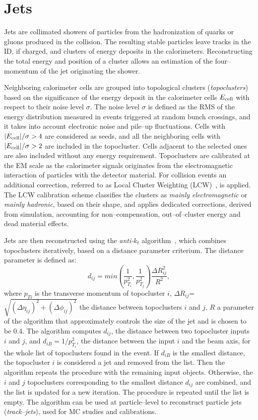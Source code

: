\section{Jets}
\label{sec:jets}

Jets are collimated showers of particles from the hadronization of
quarks or gluons produced in the collision.
The resulting stable particles leave tracks in the ID, if charged, and
clusters of energy deposits in the calorimeters.
Reconstructing the total energy and position of a cluster allows an
estimation of the four--momentum of the jet originating the shower.

Neighboring calorimeter cells are grouped into topological clusters
({\it topoclusters}) based on the significance of the energy deposit
in the calorimeter cells $E_{\rm cell}$ with respect to their noise
level $\sigma$. The noise level $\sigma$ is defined as the RMS of the
energy distribution measured in events triggered at random bunch
crossings, and it takes into account electronic noise and pile--up
fluctuations. Cells with $|E_{\rm cell}|/\sigma>4$ are considered as
seeds, and all the neighboring cells with $|E_{\rm cell}|/\sigma > 2$
are included in the topocluster. Cells adjacent to the selected ones
are also included without any energy requirement.
Topoclusters are calibrated at the EM scale as the
calorimeter signals originates from the electromagnetic interaction of
particles with the detector material. For \eighttev{} collision events
an additional correction, referred to as Local Cluster Weighting
(LCW)~\cite{lcwcalib}, is applied. The LCW calibration
scheme classifies the clusters as {\it mainly electromagnetic} or
{\it mainly hadronic}, based on their shape, and applies
dedicated corrections, derived from simulation, accounting for
non--compensation, out--of--cluster energy and dead material effects. 

Jets are then reconstructed using the {\it anti-$k_t$}
algorithm~\cite{antiktalgo}, which combines topoclusters iteratively,
based on a distance parameter criterium. The distance parameter is
defined as:
\begin{equation}
d_{ij}=min(\frac{1}{p_{T_i}^2},\frac{1}{p_{T_j}^2})\frac{\Delta R_{ij}^{2}}{R^{2}},
\end{equation}
where $p_{Ti}$ is the transverse momentum of topocluster $i$, 
$\Delta R_{ij}$=$\sqrt{(\Delta\eta_{ij})^{2}+(\Delta\phi_{ij})^{2}}$ the distance 
between topoclusters $i$ and
$j$, $R$ a parameter of the algorithm that approximately controls the size
of the jet and is chosen to be 0.4.
The algorithm computes $d_{ij}$, the distance between two topocluster
inputs $i$ and $j$, and $d_{iB}=1/p_{T_i}^2$,  the distance between the input $i$
and the beam axis, for the whole list of topoclusters found in the
event. If $d_{iB}$ is the smallest distance, the
topocluster $i$ is considered a jet and removed from the list. Then the
algorithm repeats the procedure with the remaining input objects.
Otherwise, the $i$ and $j$ topoclusters corresponding to the smallest
distance $d_{ij}$ are combined, and the list is updated for a new
iteration.
The procedure is repeated until the list is empty.
The algorithm can be used at particle--level to reconstruct particle
jets ({\it track--jets}), used for MC studies and calibrations.

